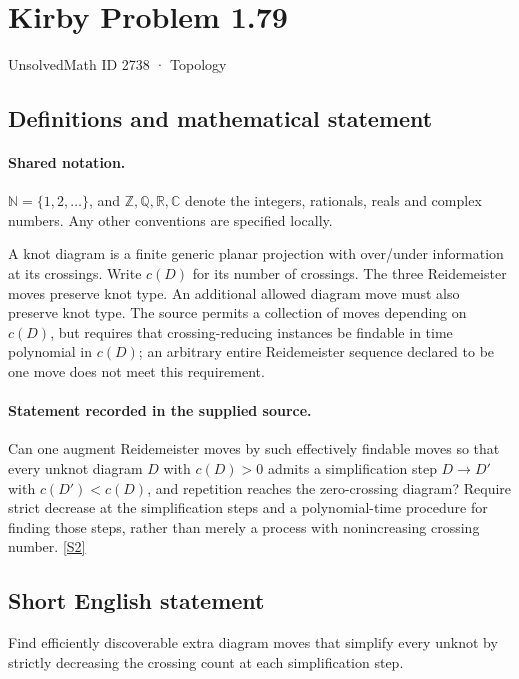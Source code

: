 \documentclass[11pt]{article}
\newcommand{\sref}[2]{\hyperlink{source:#1:#2}{[S#2]}}
\begin{document}
\setcounter{section}{2737}
\section{Kirby Problem 1.79}\label{2738}
{\small\sffamily UnsolvedMath ID 2738 · Topology}
\subsection{Definitions and mathematical statement}

\paragraph{Shared notation.}$\mathbb N=\{1,2,\ldots\}$, and $\mathbb Z,\mathbb Q,\mathbb R,\mathbb C$ denote the integers, rationals, reals and complex numbers. Any other conventions are specified locally.


A knot diagram is a finite generic planar projection with over/under information at its crossings. Write $c(D)$ for its number of crossings. The three Reidemeister moves preserve knot type. An additional allowed diagram move must also preserve knot type. The source permits a collection of moves depending on $c(D)$, but requires that crossing-reducing instances be findable in time polynomial in $c(D)$; an arbitrary entire Reidemeister sequence declared to be one move does not meet this requirement.
\paragraph{Statement recorded in the supplied source.}
Can one augment Reidemeister moves by such effectively findable moves so that every unknot diagram $D$ with $c(D)>0$ admits a simplification step $D\to D'$ with $c(D')<c(D)$, and repetition reaches the zero-crossing diagram? Require strict decrease at the simplification steps and a polynomial-time procedure for finding those steps, rather than merely a process with nonincreasing crossing number. \sref{2738}{2}

\subsection{Short English statement}
Find efficiently discoverable extra diagram moves that simplify every unknot by strictly decreasing the crossing count at each simplification step.
\end{document}
